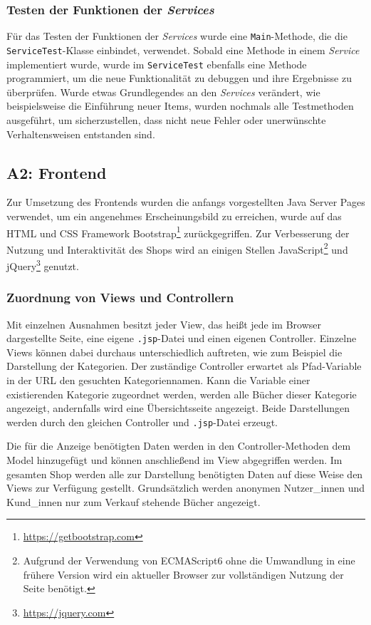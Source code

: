 		\subsubsection{Testen der Funktionen der \textit{Services}}
		Für das Testen der Funktionen der \textit{Services} wurde eine \texttt{Main}-Methode, die die \texttt{ServiceTest}-Klasse einbindet, verwendet. Sobald eine Methode in einem \textit{Service} implementiert wurde, wurde im \texttt{ServiceTest} ebenfalls eine Methode programmiert, um die neue Funktionalität zu debuggen und ihre Ergebnisse zu überprüfen. Wurde etwas Grundlegendes an den \textit{Services} verändert, wie beispielsweise die Einführung neuer Items, wurden nochmals alle Testmethoden ausgeführt, um sicherzustellen, dass nicht neue Fehler oder unerwünschte Verhaltensweisen entstanden sind.
		
	\subsection{A2: Frontend}
	Zur Umsetzung des Frontends wurden die anfangs vorgestellten Java Server Pages verwendet, um ein angenehmes Erscheinungsbild zu erreichen, wurde auf das HTML und CSS Framework Bootstrap\footnote{\hyperlink{https://getbootstrap.com}{https://getbootstrap.com}} zurückgegriffen. Zur Verbesserung der Nutzung und Interaktivität des Shops wird an einigen Stellen JavaScript\footnote{Aufgrund der Verwendung von ECMAScript6 ohne die Umwandlung in eine frühere Version wird ein aktueller Browser zur vollständigen Nutzung der Seite benötigt.} und jQuery\footnote{\hyperlink{https://jquery.com}{https://jquery.com}} genutzt.
	
		\subsubsection{Zuordnung von Views und Controllern}	
		Mit einzelnen Ausnahmen besitzt jeder View, das heißt jede im Browser dargestellte Seite, eine eigene \lstinline|.jsp|-Datei und einen eigenen Controller. Einzelne Views können dabei durchaus unterschiedlich auftreten, wie zum Beispiel die Darstellung der Kategorien. Der zuständige Controller erwartet als Pfad-Variable in der URL den gesuchten Kategoriennamen. Kann die Variable einer existierenden Kategorie zugeordnet werden, werden alle Bücher dieser Kategorie angezeigt, andernfalls wird eine Übersichtsseite angezeigt. Beide Darstellungen werden durch den gleichen Controller und \lstinline|.jsp|-Datei erzeugt.
		
		Die für die Anzeige benötigten Daten werden in den Controller-Methoden dem Model hinzugefügt und können anschließend im View abgegriffen werden. Im gesamten Shop werden alle zur Darstellung benötigten Daten auf diese Weise den Views zur Verfügung gestellt. Grundsätzlich werden anonymen Nutzer\_innen und Kund\_innen nur zum Verkauf stehende Bücher angezeigt.
		
